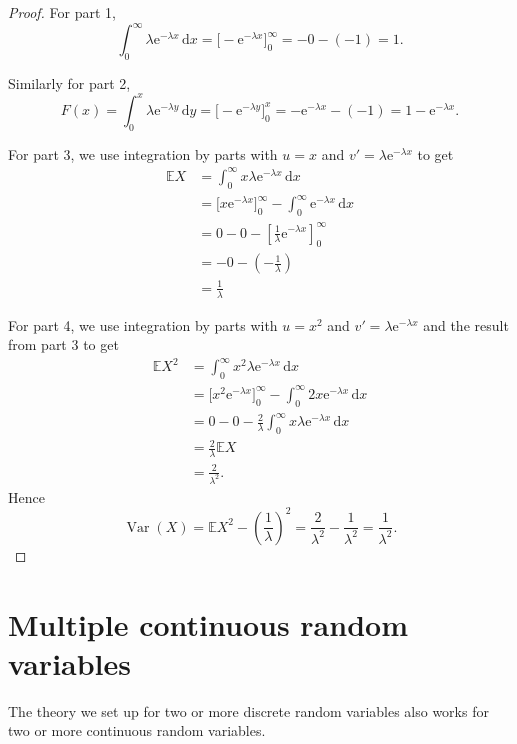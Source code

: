 \documentclass[
  a4paper,
]{book}
\theoremstyle{definition}
\theoremstyle{definition}
\theoremstyle{definition}
\theoremstyle{definition}
\theoremstyle{remark}
\begin{document}
\begin{proof}
For part 1,
\[ \int_0^\infty \lambda \mathrm{e}^{-\lambda x}\,\mathrm{d}x
     = \big[-\mathrm{e}^{-\lambda x} \big]_0^\infty = -0 -(-1) = 1 . \]

Similarly for part 2,
\[ F(x) = \int_0^x \lambda \mathrm{e}^{-\lambda y}\,\mathrm{d}y
     = \big[-\mathrm{e}^{-\lambda y} \big]_0^x = -\mathrm{e}^{-\lambda x} -(-1) = 1 - \mathrm{e}^{-\lambda x}. \]

For part 3, we use integration by parts with \(u = x\) and \(v' = \lambda \mathrm{e}^{-\lambda x}\) to get
\begin{align*}
\mathbb EX &= \int_0^\infty x  \lambda \mathrm{e}^{-\lambda x}\,\mathrm{d}x \\
  &= \big[x \mathrm{e}^{-\lambda x}\big]_0^\infty - \int_0^\infty \mathrm{e}^{-\lambda x}\,\mathrm{d}x \\
  &= 0 - 0 - \left[ \frac{1}{\lambda} \mathrm{e}^{-\lambda x} \right]_0^\infty \\
  &= -0 - \left(- \frac{1}{\lambda}\right) \\
  &= \frac{1}{\lambda}
\end{align*}

For part 4, we use integration by parts with \(u = x^2\) and \(v' = \lambda \mathrm{e}^{-\lambda x}\) and the result from part 3 to get
\begin{align*}
\mathbb EX^2 &= \int_0^\infty x^2  \lambda \mathrm{e}^{-\lambda x}\,\mathrm{d}x \\
  &= \big[x^2 \mathrm{e}^{-\lambda x}\big]_0^\infty - \int_0^\infty 2x \mathrm{e}^{-\lambda x}\,\mathrm{d}x \\
  &= 0 - 0 - \frac{2}{\lambda} \int_0^\infty x  \lambda \mathrm{e}^{-\lambda x}\,\mathrm{d}x \\
  &= \frac{2}{\lambda} \mathbb EX \\
  &= \frac{2}{\lambda^2} .
\end{align*}
Hence
\[ \operatorname{Var}(X) = \mathbb EX^2 - \left(\frac{1}{\lambda}\right)^2 =  \frac{2}{\lambda^2} - \frac{1}{\lambda^2} = \frac{1}{\lambda^2} .  \]
\end{proof}

\hypertarget{continuous-multiple}{%
\section{Multiple continuous random variables}\label{continuous-multiple}}

The theory we set up for two or more discrete random variables also works for two or more continuous random variables.
\end{document}
